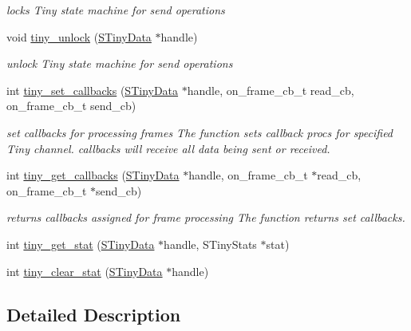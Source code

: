 \begin{DoxyCompactItemize}
\begin{DoxyCompactList}\small\item\em locks Tiny state machine for send operations \end{DoxyCompactList}\item 
void \hyperlink{group__ADVANCED__API_gae4bfad55a4ef5814a5af50f044f6d7cd}{tiny\+\_\+unlock} (\hyperlink{structSTinyData}{S\+Tiny\+Data} $\ast$handle)
\begin{DoxyCompactList}\small\item\em unlock Tiny state machine for send operations \end{DoxyCompactList}\item 
int \hyperlink{group__ADVANCED__API_gac562103dd1699b82fddf29dccdc0ec7c}{tiny\+\_\+set\+\_\+callbacks} (\hyperlink{structSTinyData}{S\+Tiny\+Data} $\ast$handle, on\+\_\+frame\+\_\+cb\+\_\+t read\+\_\+cb, on\+\_\+frame\+\_\+cb\+\_\+t send\+\_\+cb)
\begin{DoxyCompactList}\small\item\em set callbacks for processing frames The function sets callback procs for specified Tiny channel. callbacks will receive all data being sent or received. \end{DoxyCompactList}\item 
int \hyperlink{group__ADVANCED__API_gabe38a1f81966f6901eb2f6969b568298}{tiny\+\_\+get\+\_\+callbacks} (\hyperlink{structSTinyData}{S\+Tiny\+Data} $\ast$handle, on\+\_\+frame\+\_\+cb\+\_\+t $\ast$read\+\_\+cb, on\+\_\+frame\+\_\+cb\+\_\+t $\ast$send\+\_\+cb)
\begin{DoxyCompactList}\small\item\em returns callbacks assigned for frame processing The function returns set callbacks. \end{DoxyCompactList}\item 
int \hyperlink{group__ADVANCED__API_ga5f61774b2027a91f772f31d943acdd3f}{tiny\+\_\+get\+\_\+stat} (\hyperlink{structSTinyData}{S\+Tiny\+Data} $\ast$handle, S\+Tiny\+Stats $\ast$stat)
\item 
int \hyperlink{group__ADVANCED__API_gac75ee03ea3691b0a8bf842d764b342d9}{tiny\+\_\+clear\+\_\+stat} (\hyperlink{structSTinyData}{S\+Tiny\+Data} $\ast$handle)
\end{DoxyCompactItemize}


\subsection{Detailed Description}


